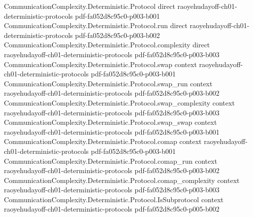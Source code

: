 \begin{theorem}
\label{CommunicationComplexity.Deterministic.Protocol.reaches_isRectangle}
\leanok
{}
\proofstep
  {CommunicationComplexity.Deterministic.Protocol}
  {direct}
  {raoyehudayoff-ch01-deterministic-protocols}
  {pdf-fa052d8c95c0-p003-b001}
\proofstep
  {CommunicationComplexity.Deterministic.Protocol.run}
  {direct}
  {raoyehudayoff-ch01-deterministic-protocols}
  {pdf-fa052d8c95c0-p003-b002}
\proofstep
  {CommunicationComplexity.Deterministic.Protocol.complexity}
  {direct}
  {raoyehudayoff-ch01-deterministic-protocols}
  {pdf-fa052d8c95c0-p003-b003}
\proofstep
  {CommunicationComplexity.Deterministic.Protocol.swap}
  {context}
  {raoyehudayoff-ch01-deterministic-protocols}
  {pdf-fa052d8c95c0-p003-b001}
\proofstep
  {CommunicationComplexity.Deterministic.Protocol.swap_run}
  {context}
  {raoyehudayoff-ch01-deterministic-protocols}
  {pdf-fa052d8c95c0-p003-b002}
\proofstep
  {CommunicationComplexity.Deterministic.Protocol.swap_complexity}
  {context}
  {raoyehudayoff-ch01-deterministic-protocols}
  {pdf-fa052d8c95c0-p003-b003}
\proofstep
  {CommunicationComplexity.Deterministic.Protocol.swap_swap}
  {context}
  {raoyehudayoff-ch01-deterministic-protocols}
  {pdf-fa052d8c95c0-p003-b001}
\proofstep
  {CommunicationComplexity.Deterministic.Protocol.comap}
  {context}
  {raoyehudayoff-ch01-deterministic-protocols}
  {pdf-fa052d8c95c0-p003-b001}
\proofstep
  {CommunicationComplexity.Deterministic.Protocol.comap_run}
  {context}
  {raoyehudayoff-ch01-deterministic-protocols}
  {pdf-fa052d8c95c0-p003-b002}
\proofstep
  {CommunicationComplexity.Deterministic.Protocol.comap_complexity}
  {context}
  {raoyehudayoff-ch01-deterministic-protocols}
  {pdf-fa052d8c95c0-p003-b003}
\proofstep
  {CommunicationComplexity.Deterministic.Protocol.IsSubprotocol}
  {context}
  {raoyehudayoff-ch01-deterministic-protocols}
  {pdf-fa052d8c95c0-p005-b002}

\end{theorem}
